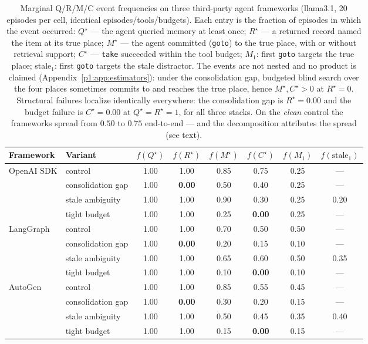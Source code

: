 \documentclass{article}
\newcommand{\method}[1]{\texttt{#1}}
\begin{document}
\begin{table}[h]
\caption{Marginal Q/R/M/C event frequencies on three third-party
agent frameworks (llama3.1, 20 episodes per cell, identical
episodes/tools/budgets). Each entry is the fraction of episodes in
which the event occurred: $Q^\star$ --- the agent queried memory at
least once; $R^\star$ --- a returned record named the item at its
true place; $M^\star$ --- the agent committed (\method{goto}) to the
true place, with or without retrieval support; $C^\star$ ---
\method{take} succeeded within the tool budget; $M_1$: first
\method{goto} targets the true place; stale$_1$: first \method{goto}
targets the stale distractor. The events are not nested and no
product is claimed (Appendix~\ref{p1:app:estimators}): under the
consolidation gap, budgeted blind search over the four places
sometimes commits to and reaches the true place, hence
$M^\star, C^\star > 0$ at $R^\star{=}0$. Structural failures localize
identically everywhere: the consolidation gap is $R^\star{=}0.00$ and
the budget failure is $C^\star{=}0.00$ at $Q^\star{=}R^\star{=}1$,
for all three stacks. On the \emph{clean} control the frameworks
spread from $0.50$ to $0.75$ end-to-end --- and the decomposition
attributes the spread (see text).}
\label{p1:tab:external}
\centering
\small
\begin{tabular}{llcccccc}
\toprule
Framework & Variant & $f(Q^\star)$ & $f(R^\star)$ & $f(M^\star)$ & $f(C^\star)$ & $f(M_1)$ & $f(\text{stale}_1)$ \\
\midrule
OpenAI SDK & control     & 1.00 & 1.00 & 0.85 & 0.75 & 0.25 & --- \\
           & consolidation gap & 1.00 & \textbf{0.00} & 0.50 & 0.40 & 0.25 & --- \\
           & stale ambiguity   & 1.00 & 1.00 & 0.90 & 0.30 & 0.25 & 0.20 \\
           & tight budget      & 1.00 & 1.00 & 0.25 & \textbf{0.00} & 0.25 & --- \\
\midrule
LangGraph  & control     & 1.00 & 1.00 & 0.70 & 0.50 & 0.50 & --- \\
           & consolidation gap & 1.00 & \textbf{0.00} & 0.20 & 0.15 & 0.10 & --- \\
           & stale ambiguity   & 1.00 & 1.00 & 0.65 & 0.60 & 0.50 & 0.35 \\
           & tight budget      & 1.00 & 1.00 & 0.10 & \textbf{0.00} & 0.10 & --- \\
\midrule
AutoGen    & control     & 1.00 & 1.00 & 0.85 & 0.55 & 0.45 & --- \\
           & consolidation gap & 1.00 & \textbf{0.00} & 0.30 & 0.20 & 0.15 & --- \\
           & stale ambiguity   & 1.00 & 1.00 & 0.50 & 0.45 & 0.35 & 0.40 \\
           & tight budget      & 1.00 & 1.00 & 0.15 & \textbf{0.00} & 0.15 & --- \\
\bottomrule
\end{tabular}
\end{table}
\end{document}
